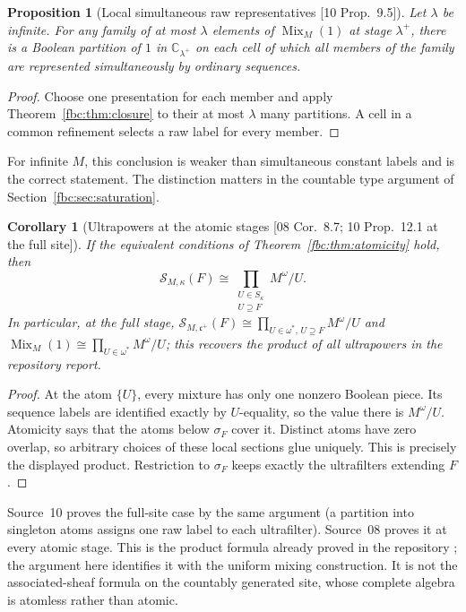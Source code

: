 \documentclass[11pt,letterpaper]{article}
\newtheorem{proposition}[theorem]{Proposition}
\newtheorem{corollary}[theorem]{Corollary}
\theoremstyle{definition}
\theoremstyle{remark}
\newcommand{\om}{\omega}
\newcommand{\C}{\mathbb C}
\newcommand{\cc}{\mathfrak c}
\newcommand{\Mix}{\operatorname{Mix}}
\newcommand{\Ssh}{\mathscr S}
\newcommand{\src}[1]{\textup{[#1]}}
\begin{document}
\begin{proposition}[Local simultaneous raw representatives \src{10 Prop.~9.5}]
\label{fbc:prop:unmix}
Let $\lambda$ be infinite. For any family of at most $\lambda$ elements
of $\Mix_M(1)$ at stage $\lambda^+$, there is a Boolean partition of $1$
in $\C_{\lambda^+}$ on each cell of which all members of the family are
represented simultaneously by ordinary sequences.
\end{proposition}
\begin{proof}
Choose one presentation for each member and apply
Theorem~\ref{fbc:thm:closure} to their at most $\lambda$ many partitions.
A cell in a common refinement selects a raw label for every member.
\end{proof}

For infinite $M$, this conclusion is weaker than simultaneous constant
labels and is the correct statement. The distinction matters in the
countable type argument of Section~\ref{fbc:sec:saturation}.

\begin{corollary}[Ultrapowers at the atomic stages \src{08 Cor.~8.7; 10 Prop.~12.1 at the full site}]
\label{fbc:cor:atomic-products}
If the equivalent conditions of Theorem~\ref{fbc:thm:atomicity} hold,
then
\[
 \Ssh_{M,\kappa}(F)\cong
 \prod_{\substack{U\in S_\kappa\\U\supseteq F}}M^\om/U.
\]
In particular, at the full stage,
$\Ssh_{M,\cc^+}(F)\cong\prod_{U\in\om^*,\,U\supseteq F}M^\om/U$ and
$\Mix_M(1)\cong\prod_{U\in\om^*}M^\om/U$; this recovers the product of
all ultrapowers in the repository report.
\end{corollary}
\begin{proof}
At the atom $\{U\}$, every mixture has only one nonzero Boolean
piece. Its sequence labels are identified exactly by $U$-equality,
so the value there is $M^\om/U$. Atomicity says that the atoms below
$\sigma_F$ cover it. Distinct atoms have zero overlap, so arbitrary
choices of these local sections glue uniquely. This is precisely
the displayed product. Restriction to $\sigma_F$ keeps exactly the
ultrafilters extending $F$.
\end{proof}

Source~10 proves the full-site case by the same argument (a partition
into singleton atoms assigns one raw label to each ultrafilter).
Source~08 proves it at every atomic stage. This is the product formula
already proved in the repository \cite[Theorem~9.2]{Repo}; the argument
here identifies it with the uniform mixing construction. It is not the
associated-sheaf formula on the countably generated site, whose complete
algebra is atomless rather than atomic.
\end{document}
